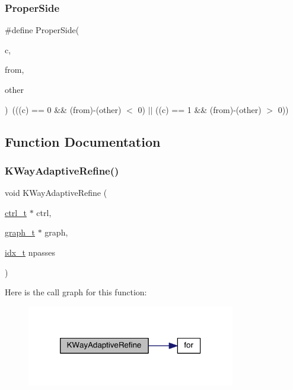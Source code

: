 \subsubsection{\texorpdfstring{Proper\+Side}{ProperSide}}
{\footnotesize\ttfamily \#define Proper\+Side(\begin{DoxyParamCaption}\item[{}]{c,  }\item[{}]{from,  }\item[{}]{other }\end{DoxyParamCaption})~(((c) == 0 \&\& (from)-\/(other) $<$ 0) $\vert$$\vert$ ((c) == 1 \&\& (from)-\/(other) $>$ 0))}



\subsection{Function Documentation}
\mbox{\label{a00335_a2183d39c5ec7859f1e28e4d2693bd965}} 
\subsubsection{\texorpdfstring{K\+Way\+Adaptive\+Refine()}{KWayAdaptiveRefine()}}
{\footnotesize\ttfamily void K\+Way\+Adaptive\+Refine (\begin{DoxyParamCaption}\item[{\hyperlink{a00742}{ctrl\+\_\+t} $\ast$}]{ctrl,  }\item[{\hyperlink{a00734}{graph\+\_\+t} $\ast$}]{graph,  }\item[{\hyperlink{a00876_aaa5262be3e700770163401acb0150f52}{idx\+\_\+t}}]{npasses }\end{DoxyParamCaption})}

Here is the call graph for this function\+:\nopagebreak
\begin{figure}[H]
\begin{center}
\leavevmode
\includegraphics[width=258pt]{a00335_a2183d39c5ec7859f1e28e4d2693bd965_cgraph}
\end{center}
\end{figure}
